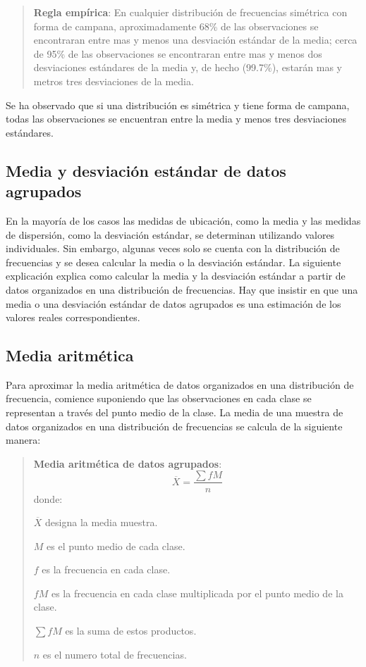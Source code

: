 \documentclass[]{article}
\begin{document}
\begin{quote}
	\textbf{Regla empírica}: En cualquier distribución de frecuencias simétrica con forma de campana, aproximadamente 68\% de las observaciones se encontraran entre mas y menos una desviación estándar de la media; cerca de 95\% de las observaciones se encontraran entre mas y menos dos desviaciones estándares de la media y, de hecho (99.7\%), estarán mas y metros tres desviaciones de la media.
\end{quote}
Se ha observado que si una distribución es simétrica y tiene forma de campana, todas las observaciones se encuentran entre la media y menos tres desviaciones estándares.

\subsection{Media y desviación estándar de datos agrupados}
En la mayoría de los casos las medidas de ubicación, como la media y las medidas de dispersión, como la desviación estándar, se determinan utilizando valores individuales. Sin embargo, algunas veces solo se cuenta con la distribución de frecuencias y se desea calcular la media o la desviación estándar. La siguiente explicación explica como calcular la media y la desviación estándar a partir de datos organizados en una distribución de frecuencias. Hay que insistir en que una media o una desviación estándar de datos agrupados es una estimación de los valores reales correspondientes.

\subsection*{Media aritmética}
Para aproximar la media aritmética de datos organizados en una distribución de frecuencia, comience suponiendo que las observaciones en cada clase se representan a través del punto medio de la clase. La media de una muestra de datos organizados en una distribución de frecuencias se calcula de la siguiente manera:

\begin{quote}
	\item \textbf{Media aritmética de datos agrupados}: \[ \overline{X} = \frac{\sum fM}{n} \]
	donde:
	\item $\overline{X}$ designa la media muestra.
	\item  $M$ es el punto medio de cada clase.
	\item $f$ es la frecuencia en cada clase.
	\item $fM$ es la frecuencia en cada clase multiplicada por el punto medio de la clase.
	\item $\sum fM$ es la suma de estos productos.
	\item $n$ es el numero total de frecuencias.
\end{quote}
\end{document}
